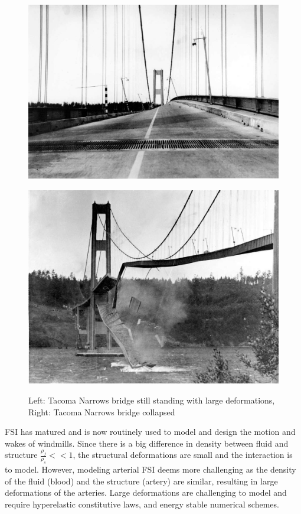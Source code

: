 \begin{figure}
\centering
\begin{minipage}{.50\textwidth}
  \centering
  \includegraphics[width=.95\linewidth]{./IntroductionToFSI/tacoma2.jpeg}
  \label{fig:test1}
\end{minipage}%
\begin{minipage}{.50\textwidth}
  \centering
  \includegraphics[width=.86\linewidth]{./IntroductionToFSI/tacoma3.jpeg}
  \label{fig:test2}
\end{minipage}
  \caption{Left: Tacoma Narrows bridge still standing with large deformations, Right: Tacoma Narrows bridge collapsed}
\end{figure}

FSI has matured and is now routinely used to model and design the motion and wakes of windmills.
Since there is a big difference in density between fluid and structure $\frac{\rho_f}{\rho_s} << 1$, the structural deformations are small and the interaction is  to model. However, modeling arterial FSI deems more challenging as the density of the fluid (blood) and the structure (artery) are similar, resulting in large deformations of the arteries. Large deformations are challenging to model and require hyperelastic constitutive laws, and energy stable numerical schemes.\newline

